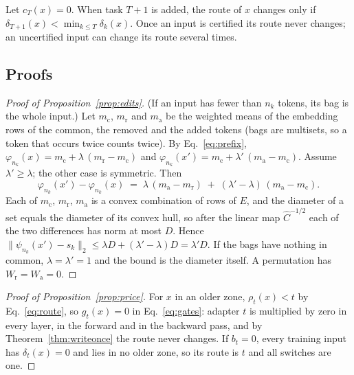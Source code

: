 \begin{proposition}
\label{prop:uncertified}
Let $c_T(x) = 0$. When task $T+1$ is added, the route of $x$ changes only if
$\delta_{T+1}(x) < \min_{k \le T} \delta_k(x)$. Once an input is certified its route never changes;
an uncertified input can change its route several times.
\end{proposition}

\subsection{Proofs}


\begin{proof}[Proof of Proposition~\ref{prop:edits}]
(If an input has fewer than $n_k$ tokens, its bag is the whole input.) Let $m_{\mathrm{c}}$, $m_{\mathrm{r}}$ and $m_{\mathrm{a}}$ be the weighted means of the embedding rows of the common, the removed
and the added tokens (bags are multisets, so a token that occurs twice counts twice). By
Eq.~\eqref{eq:prefix}, $\varphi_{n_k}(x) = m_{\mathrm{c}} + \lambda\,(m_{\mathrm{r}} - m_{\mathrm{c}})$ and
$\varphi_{n_k}(x') = m_{\mathrm{c}} + \lambda'\,(m_{\mathrm{a}} - m_{\mathrm{c}})$. Assume $\lambda' \ge \lambda$; the other case is
symmetric. Then
\[
  \varphi_{n_k}(x') - \varphi_{n_k}(x) \;=\; \lambda\,(m_{\mathrm{a}} - m_{\mathrm{r}}) \;+\; (\lambda' - \lambda)\,(m_{\mathrm{a}} - m_{\mathrm{c}}) .
\]
Each of $m_{\mathrm{c}}$, $m_{\mathrm{r}}$, $m_{\mathrm{a}}$ is a convex combination of rows of $E$, and the diameter of a set
equals the diameter of its convex hull, so after the linear map $\hat{C}^{-1/2}$ each of the two
differences has norm at most $D$. Hence
$\lVert \psi_{n_k}(x') - s_k \rVert_2 \le \lambda D + (\lambda' - \lambda) D = \lambda' D$. If the bags
have nothing in common, $\lambda = \lambda' = 1$ and the bound is the diameter itself. A
permutation has $W_{\mathrm{r}} = W_{\mathrm{a}} = 0$.
\end{proof}

\begin{proof}[Proof of Proposition~\ref{prop:price}]
For $x$ in an older zone, $\rho_t(x) < t$ by Eq.~\eqref{eq:route}, so $g_t(x) = 0$ in
Eq.~\eqref{eq:gates}: adapter $t$ is multiplied by zero in every layer, in the forward and in the
backward pass, and by Theorem~\ref{thm:writeonce} the route never changes. If $b_t = 0$, every
training input has $\delta_t(x) = 0$ and lies in no older zone, so its route is $t$ and all switches
are one.
\end{proof}

